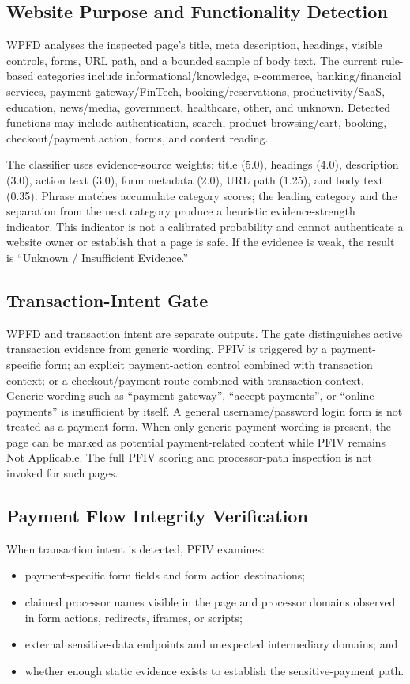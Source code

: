 \documentclass[conference]{IEEEtran}
\begin{document}
\subsection{Website Purpose and Functionality Detection}
WPFD analyses the inspected page's title, meta description, headings, visible controls, forms, URL path, and a bounded sample of body text. The current rule-based categories include informational/knowledge, e-commerce, banking/financial services, payment gateway/FinTech, booking/reservations, productivity/SaaS, education, news/media, government, healthcare, other, and unknown. Detected functions may include authentication, search, product browsing/cart, booking, checkout/payment action, forms, and content reading.

The classifier uses evidence-source weights: title (5.0), headings (4.0), description (3.0), action text (3.0), form metadata (2.0), URL path (1.25), and body text (0.35). Phrase matches accumulate category scores; the leading category and the separation from the next category produce a heuristic evidence-strength indicator. This indicator is not a calibrated probability and cannot authenticate a website owner or establish that a page is safe. If the evidence is weak, the result is ``Unknown / Insufficient Evidence.''

\subsection{Transaction-Intent Gate}
WPFD and transaction intent are separate outputs. The gate distinguishes active transaction evidence from generic wording. PFIV is triggered by a payment-specific form; an explicit payment-action control combined with transaction context; or a checkout/payment route combined with transaction context. Generic wording such as “payment gateway”, “accept payments”, or “online payments” is insufficient by itself. A general username/password login form is not treated as a payment form. When only generic payment wording is present, the page can be marked as potential payment-related content while PFIV remains Not Applicable. The full PFIV scoring and processor-path inspection is not invoked for such pages.

\subsection{Payment Flow Integrity Verification}
When transaction intent is detected, PFIV examines:
\begin{itemize}[leftmargin=*]
  \item payment-specific form fields and form action destinations;
  \item claimed processor names visible in the page and processor domains observed in form actions, redirects, iframes, or scripts;
  \item external sensitive-data endpoints and unexpected intermediary domains; and
  \item whether enough static evidence exists to establish the sensitive-payment path.
\end{itemize}
\end{document}
